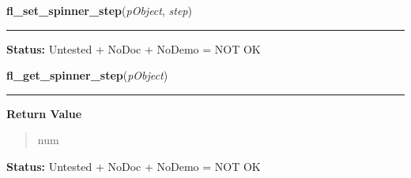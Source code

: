     \label{xformslib:library:fl_set_spinner_step}

    \vspace{0.5ex}

\hspace{.8\funcindent}\begin{boxedminipage}{\funcwidth}

    \raggedright \textbf{fl\_set\_spinner\_step}(\textit{pObject}, \textit{step})

    \vspace{-1.5ex}

    \rule{\textwidth}{0.5\fboxrule}
\setlength{\parskip}{2ex}
\setlength{\parskip}{1ex}
\textbf{Status:} Untested + NoDoc + NoDemo = NOT OK



    \end{boxedminipage}

    \label{xformslib:library:fl_get_spinner_step}

    \vspace{0.5ex}

\hspace{.8\funcindent}\begin{boxedminipage}{\funcwidth}

    \raggedright \textbf{fl\_get\_spinner\_step}(\textit{pObject})

    \vspace{-1.5ex}

    \rule{\textwidth}{0.5\fboxrule}
\setlength{\parskip}{2ex}
\setlength{\parskip}{1ex}
      \textbf{Return Value}
    \vspace{-1ex}

      \begin{quote}
      num

      \end{quote}

\textbf{Status:} Untested + NoDoc + NoDemo = NOT OK



    \end{boxedminipage}

    \label{xformslib:library:fl_set_spinner_precision}


